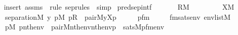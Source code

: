 \begin{isabellebody}
%
\isadelimproof
\ \ %
\endisadelimproof
%
\isatagproof
{}\isamarkupfalse%
\ {\isacharparenleft}{\kern0pt}insert\ assms\ {\isacharsemicolon}{\kern0pt}\ {\isacharparenleft}{\kern0pt}rule\ sep{\isacharunderscore}{\kern0pt}rules\ {\isacharbar}{\kern0pt}\ simp{\isacharparenright}{\kern0pt}{\isacharplus}{\kern0pt}{\isacharparenright}{\kern0pt}%
\endisatagproof
{\isafoldproof}%
%
\isadelimproof
\isanewline
%
\endisadelimproof
\isanewline
\isanewline
{}\isamarkupfalse%
\ pred{\isacharunderscore}{\kern0pt}sep{\isacharunderscore}{\kern0pt}intf{\isacharcolon}{\kern0pt}\isanewline
\ \ \isanewline
\ \ \ \ {\isachardoublequoteopen}R{\isasymin}M{\isachardoublequoteclose}\isanewline
\ \ \ \ \isanewline
\ \ \ \ {\isachardoublequoteopen}X{\isasymin}M{\isachardoublequoteclose}\isanewline
\ \ \isanewline
\ \ \ \ {\isachardoublequoteopen}separation{\isacharparenleft}{\kern0pt}{\isacharhash}{\kern0pt}{\isacharhash}{\kern0pt}M{\isacharcomma}{\kern0pt}\ {\isasymlambda}y{\isachardot}{\kern0pt}\ {\isasymexists}p{\isasymin}M{\isachardot}{\kern0pt}\ p{\isasymin}R\ {\isacharampersand}{\kern0pt}\ pair{\isacharparenleft}{\kern0pt}{\isacharhash}{\kern0pt}{\isacharhash}{\kern0pt}M{\isacharcomma}{\kern0pt}y{\isacharcomma}{\kern0pt}X{\isacharcomma}{\kern0pt}p{\isacharparenright}{\kern0pt}{\isacharparenright}{\kern0pt}{\isachardoublequoteclose}\isanewline
%
\isadelimproof
%
\endisadelimproof
%
\isatagproof
{}\isamarkupfalse%
\ {\isacharminus}{\kern0pt}\isanewline
\ \ \isamarkupfalse%
\ pfm\ \isanewline
\ \ \ \ fmsats{\isacharcolon}{\kern0pt}{\isachardoublequoteopen}{\isasymAnd}env{\isachardot}{\kern0pt}\ env{\isasymin}list{\isacharparenleft}{\kern0pt}M{\isacharparenright}{\kern0pt}\ {\isasymLongrightarrow}\isanewline
\ \ \ \ {\isacharparenleft}{\kern0pt}{\isasymexists}p{\isasymin}M{\isachardot}{\kern0pt}\ p{\isasymin}nth{\isacharparenleft}{\kern0pt}{}{\isacharcomma}{\kern0pt}env{\isacharparenright}{\kern0pt}\ {\isacharampersand}{\kern0pt}\ pair{\isacharparenleft}{\kern0pt}{\isacharhash}{\kern0pt}{\isacharhash}{\kern0pt}M{\isacharcomma}{\kern0pt}nth{\isacharparenleft}{\kern0pt}{}{\isacharcomma}{\kern0pt}env{\isacharparenright}{\kern0pt}{\isacharcomma}{\kern0pt}nth{\isacharparenleft}{\kern0pt}{}{\isacharcomma}{\kern0pt}env{\isacharparenright}{\kern0pt}{\isacharcomma}{\kern0pt}p{\isacharparenright}{\kern0pt}{\isacharparenright}{\kern0pt}\ {\isasymlongleftrightarrow}\ sats{\isacharparenleft}{\kern0pt}M{\isacharcomma}{\kern0pt}pfm{\isacharparenleft}{\kern0pt}{}{\isacharcomma}{\kern0pt}{}{\isacharcomma}{\kern0pt}{}{\isacharparenright}{\kern0pt}{\isacharcomma}{\kern0pt}env{\isacharparenright}{\kern0pt}{\isachardoublequoteclose}\isanewline

\end{isabellebody}
